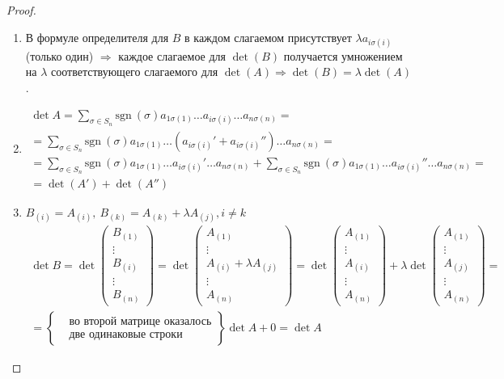 \documentclass[a4paper,12pt]{article}
\newcommand{\sgn}{\mathrm{sgn\:}}
\begin{document}
	\begin{proof}
		\ 
		
		\begin{enumerate}
			\item В формуле определителя для $B$ в каждом слагаемом присутствует $\lambda a_{i \sigma(i)}$ (только один) $\Rightarrow$ каждое слагаемое для $\det(B)$ получается умножением на $\lambda$ соответствующего слагаемого для $\det(A) \Rightarrow \det(B) = \lambda \det(A)$.
			\item \begin{gather*}
			\det{A} = \sum_{\sigma \in S_n} \sgn(\sigma)a_{1\sigma(1)}\dots a_{i\sigma(i)}\dots a_{n\sigma(n)} =\\= \sum_{\sigma \in S_n} \sgn(\sigma)a_{1\sigma(1)}\dots (a_{i \sigma(i)}'+ a_{i \sigma(i)}'')\dots a_{n\sigma(n)} = \\ = \sum_{\sigma \in S_n}\sgn(\sigma)a_{1\sigma(1)}\dots a_{i\sigma(i)}'\dots a_{n\sigma(n)} + \sum_{\sigma \in S_n}\sgn(\sigma)a_{1\sigma(1)}\dots a_{i\sigma(i)}''\dots a_{n\sigma(n)} =\\= \det(A')+ \det(A'')
			\end{gather*}
			\item $B_{(i)} = A_{(i)},\ B_{(k)} = A_{(k)} + \lambda A_{(j)}, i \neq k$
			\begin{gather*}
			\det{B} = \det
			\begin{pmatrix}
			B_{(1)}\\
			\vdots\\
			B_{(i)}\\
			\vdots\\
			B_{(n)}
			\end{pmatrix}
			= \det
			\begin{pmatrix}
			A_{(1)}\\
			\vdots\\
			A_{(i)} + \lambda A_{(j)}\\
			\vdots\\
			A_{(n)}
			\end{pmatrix}
			= \det
			\begin{pmatrix}
			A_{(1)}\\
			\vdots\\
			A_{(i)}\\
			\vdots\\
			A_{(n)}
			\end{pmatrix}
			+ \lambda \det
			\begin{pmatrix}
			A_{(1)}\\
			\vdots\\
			A_{(j)}\\
			\vdots\\
			A_{(n)}
			\end{pmatrix}
			= \\ =
			\left \lbrace 
			\begin{aligned}
			&\text{во второй матрице оказалось}\\
			&\text{две одинаковые строки}
			\end{aligned}
			\right \rbrace \det{A} + 0 = \det{A}
			\end{gather*}
		\end{enumerate}
	\end{proof}
\end{document}
